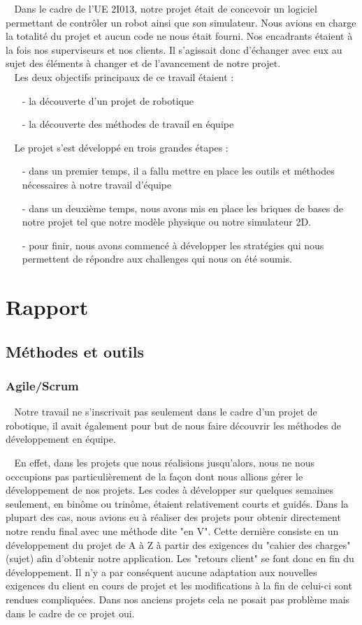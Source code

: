 \documentclass[12pt]{article}
\def\tab{$\>\>\>\>$}
\begin{document}
\tab Dans le cadre de l'UE 2I013, notre projet était de concevoir un logiciel permettant de contrôler un robot ainsi que son simulateur. Nous avions en charge la totalité du projet et aucun code ne nous était fourni. Nos encadrants étaient à la fois nos superviseurs et nos clients. Il s'agissait donc d'échanger avec eux au sujet des éléments à changer et de l'avancement de notre projet.\\

\tab Les deux objectifs principaux de ce travail étaient : \begin{itemize}
\item[-] la découverte d'un projet de robotique
\item[-] la découverte des méthodes de travail en équipe
\item[]
\end{itemize}
\tab Le projet s'est développé en trois grandes étapes :\begin{itemize}
\item[-] dans un premier temps, il a fallu mettre en place les outils et méthodes nécessaires à notre travail d'équipe
\item[-] dans un deuxième temps, nous avons mis en place les briques de bases de notre projet tel que notre modèle physique ou notre simulateur 2D.
\item[-] pour finir, nous avons commencé à développer les stratégies qui nous permettent de répondre aux challenges qui nous on été soumis.
\end{itemize}


\newpage
\section{Rapport}
\subsection{Méthodes et outils}
\subsubsection{Agile/Scrum}

\tab Notre travail ne s'inscrivait pas seulement dans le cadre d'un projet de robotique, il avait également pour but de nous faire découvrir les méthodes de développement en équipe.

\tab En effet, dans les projets que nous réalisions jusqu'alors, nous ne nous occcupions pas particulièrement de la façon dont nous allions gérer le développement de nos projets. Les codes à développer sur quelques semaines seulement, en binôme ou trinôme, étaient relativement courts et guidés. Dans la plupart des cas, nous avions eu à réaliser des projets pour obtenir directement notre rendu final avec une méthode dite "en V". Cette dernière consiste en un développement du projet de A à Z à partir des exigences du "cahier des charges" (sujet) afin d'obtenir notre application. Les "retours client" se font donc en fin du développement. Il n'y a par conséquent aucune adaptation aux nouvelles exigences du client en cours de projet et les modifications à la fin de celui-ci sont rendues compliquées. Dans nos anciens projets cela ne posait pas problème mais dans le cadre de ce projet oui.
\end{document}
